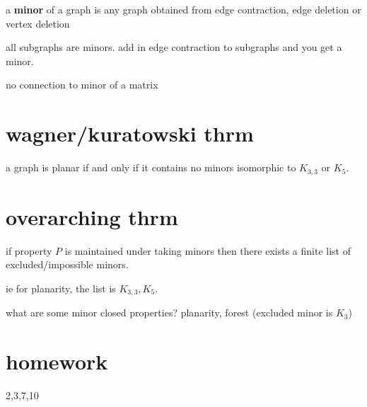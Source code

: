 \documentclass[letterpaper]{article}
\begin{document}
a {\bfseries minor} of a graph is any graph obtained from edge contraction, edge deletion or vertex deletion

all subgraphs are minors. add in edge contraction to subgraphs and you get a minor.

no connection to minor of a matrix

\section*{wagner/kuratowski thrm}
a graph is planar if and only if it contains no minors isomorphic to $K_{3,3}$ or $K_5$.

\section*{overarching thrm}
if property $P$ is maintained under taking minors then there exists a finite list of excluded/impossible minors.

ie for planarity, the list is $K_{3,3}, K_5$.

what are some minor closed properties? planarity, forest (excluded minor is $K_3$)

\section*{homework}
2,3,7,10
\end{document}
